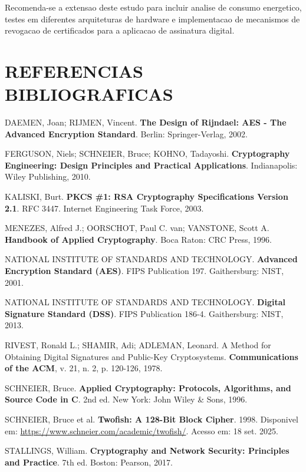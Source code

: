 \documentclass[12pt,a4paper,oneside]{article}
\begin{document}
Recomenda-se a extensao deste estudo para incluir analise de consumo energetico, testes em diferentes arquiteturas de hardware e implementacao de mecanismos de revogacao de certificados para a aplicacao de assinatura digital.

\section{REFERENCIAS BIBLIOGRAFICAS}

DAEMEN, Joan; RIJMEN, Vincent. \textbf{The Design of Rijndael: AES - The Advanced Encryption Standard}. Berlin: Springer-Verlag, 2002.

FERGUSON, Niels; SCHNEIER, Bruce; KOHNO, Tadayoshi. \textbf{Cryptography Engineering: Design Principles and Practical Applications}. Indianapolis: Wiley Publishing, 2010.

KALISKI, Burt. \textbf{PKCS \#1: RSA Cryptography Specifications Version 2.1}. RFC 3447. Internet Engineering Task Force, 2003.

MENEZES, Alfred J.; OORSCHOT, Paul C. van; VANSTONE, Scott A. \textbf{Handbook of Applied Cryptography}. Boca Raton: CRC Press, 1996.

NATIONAL INSTITUTE OF STANDARDS AND TECHNOLOGY. \textbf{Advanced Encryption Standard (AES)}. FIPS Publication 197. Gaithersburg: NIST, 2001.

NATIONAL INSTITUTE OF STANDARDS AND TECHNOLOGY. \textbf{Digital Signature Standard (DSS)}. FIPS Publication 186-4. Gaithersburg: NIST, 2013.

RIVEST, Ronald L.; SHAMIR, Adi; ADLEMAN, Leonard. A Method for Obtaining Digital Signatures and Public-Key Cryptosystems. \textbf{Communications of the ACM}, v. 21, n. 2, p. 120-126, 1978.

SCHNEIER, Bruce. \textbf{Applied Cryptography: Protocols, Algorithms, and Source Code in C}. 2nd ed. New York: John Wiley \& Sons, 1996.

SCHNEIER, Bruce et al. \textbf{Twofish: A 128-Bit Block Cipher}. 1998. Disponivel em: \url{https://www.schneier.com/academic/twofish/}. Acesso em: 18 set. 2025.

STALLINGS, William. \textbf{Cryptography and Network Security: Principles and Practice}. 7th ed. Boston: Pearson, 2017.
\end{document}
